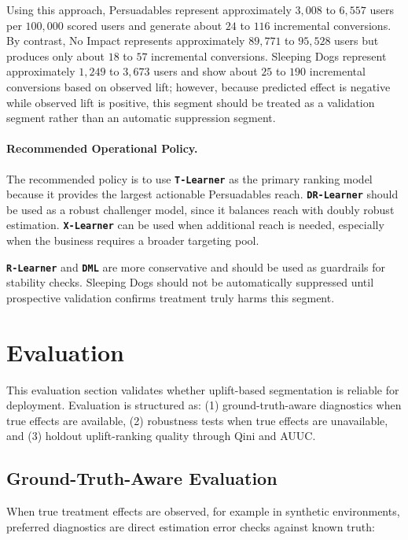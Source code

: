 \documentclass[journal,11pt,onecolumn]{IEEEtran}
\begin{document}
Using this approach, Persuadables represent approximately \(3{,}008\) to \(6{,}557\) users per \(100{,}000\) scored users and generate about \(24\) to \(116\) incremental conversions. By contrast, No Impact represents approximately \(89{,}771\) to \(95{,}528\) users but produces only about \(18\) to \(57\) incremental conversions. Sleeping Dogs represent approximately \(1{,}249\) to \(3{,}673\) users and show about \(25\) to \(190\) incremental conversions based on observed lift; however, because predicted effect is negative while observed lift is positive, this segment should be treated as a validation segment rather than an automatic suppression segment.

\paragraph{Recommended Operational Policy.}
The recommended policy is to use \textbf{\texttt{T-Learner}} as the primary ranking model because it provides the largest actionable Persuadables reach. \textbf{\texttt{DR-Learner}} should be used as a robust challenger model, since it balances reach with doubly robust estimation. \textbf{\texttt{X-Learner}} can be used when additional reach is needed, especially when the business requires a broader targeting pool.

\textbf{\texttt{R-Learner}} and \textbf{\texttt{DML}} are more conservative and should be used as guardrails for stability checks. Sleeping Dogs should not be automatically suppressed until prospective validation confirms treatment truly harms this segment.



\section{Evaluation}

This evaluation section validates whether uplift-based segmentation is reliable for deployment. Evaluation is structured as: (1) ground-truth-aware diagnostics when true effects are available, (2) robustness tests when true effects are unavailable, and (3) holdout uplift-ranking quality through Qini and AUUC.

\subsection{Ground-Truth-Aware Evaluation}

When true treatment effects are observed, for example in synthetic environments, preferred diagnostics are direct estimation error checks against known truth:
\end{document}
